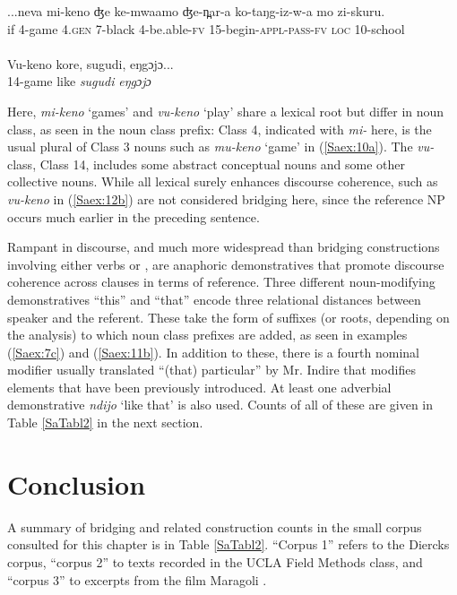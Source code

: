 \documentclass[output=paper]{LSP/langsci}
\begin{document}
\begin{exe}
\ex \label{Saex:12ab}
\begin{xlist}
\ex \label{Saex:12a}
\gll ...neva  mi-keno   ʤe   ke-mwaamo  ʤe-n̪ar-a ko-taŋg-iz-w-a     mo   zi-skuru. \\
 if  \textsc{4}-game    \textsc{4}.\textsc{gen}  \textsc{7}-black    \textsc{4}-be.able-\textsc{fv}  \textsc{15}-begin-\textsc{appl}-\textsc{pass}-\textsc{fv}    \textsc{loc}  \textsc{10}-school\\
\glt {}\\
\ex \label{Saex:12b}
\gll Vu-keno   kore,  sugudi,   eŋgɔjɔ...\\     	       
  \textsc{14}-game  like  \textit{sugudi}    \textit{eŋgɔjɔ}\\
\glt {} 
\end{xlist}
\end{exe}


Here, \textit{mi-keno} `games' and \textit{vu-keno} `play' share a lexical root but differ in noun class, as seen in the noun class prefix: Class 4, indicated with \textit{mi-}  here, is the usual plural of Class 3 nouns such as \textit{mu-keno} `game' in (\ref{Saex:10a}). The \textit{vu-} class, Class 14, includes some abstract conceptual nouns and some other collective nouns. While all lexical  surely enhances discourse coherence,  such as \textit{vu-keno} in (\ref{Saex:12b}) are not considered bridging  here, since the reference NP occurs much earlier in the preceding sentence.

Rampant in  discourse, and much more widespread than bridging constructions involving either verbs or , are anaphoric demonstratives that promote discourse coherence across clauses in terms of reference. Three different noun-modifying demonstratives ``this'' and ``that'' encode three relational distances between speaker and the referent. These take the form of suffixes (or roots, depending on the analysis) to which noun class prefixes are added, as seen in examples (\ref{Saex:7c}) and (\ref{Saex:11b}). In addition to these, there is a fourth nominal modifier usually translated ``(that) particular'' by Mr. Indire that modifies elements that have been previously introduced. At least one adverbial demonstrative \textit{ndijo} `like that' is also used. Counts of all of these are given in Table \ref{SaTabl2} in the next section.
%
\section{Conclusion}
\label{Saconcl}
A summary of bridging and related construction counts in the small corpus consulted for this chapter is in Table \ref{SaTabl2}. ``Corpus 1'' refers to the Diercks corpus, ``corpus 2'' to texts recorded in the UCLA Field Methods class, and ``corpus 3'' to excerpts from the film Maragoli \citep{Nichols1976}.
\end{document}
